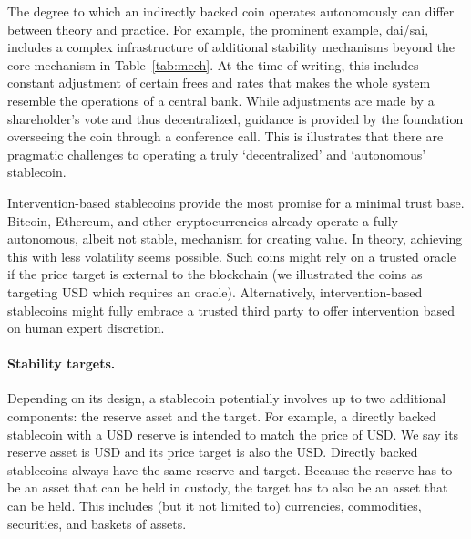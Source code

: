 The degree to which an indirectly backed coin operates autonomously can differ between theory and practice. For example, the prominent example, dai/sai, includes a complex infrastructure of additional stability mechanisms beyond the core mechanism in Table~\ref{tab:mech}. At the time of writing, this includes constant adjustment of certain frees and rates that makes the whole system resemble the operations of a central bank. While adjustments are made by a shareholder's vote and thus decentralized, guidance is provided by the foundation overseeing the coin through a conference call. This is illustrates that there are pragmatic challenges to operating a truly `decentralized' and `autonomous' stablecoin.
 
Intervention-based stablecoins provide the most promise for a minimal trust base. Bitcoin, Ethereum, and other cryptocurrencies already operate a fully autonomous, albeit not stable, mechanism for creating value. In theory, achieving this with less volatility seems possible. Such coins might rely on a trusted oracle if the price target is external to the blockchain (we illustrated the coins as targeting USD which requires an oracle). Alternatively, intervention-based stablecoins might fully embrace a trusted third party to offer intervention based on human expert discretion.
 
\paragraph{Stability targets.} 

Depending on its design, a stablecoin potentially involves up to two additional components: the reserve asset and the target. For example, a directly backed stablecoin with a USD reserve is intended to match the price of USD. We say its reserve asset is USD and its price target is also the USD. Directly backed stablecoins always have the same reserve and target. Because the reserve has to be an asset that can be held in custody, the target has to also be an asset that can be held. This includes (but it not limited to) currencies, commodities, securities, and baskets of assets.

